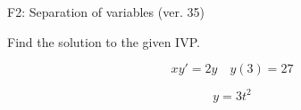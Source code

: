 \begin{exercise}
  \begin{exerciseTitle}F2: Separation of variables (ver. 35)\end{exerciseTitle}
  \begin{exerciseStatement}
    
Find the solution to the given IVP.

    
\[xy'= 2 y \hspace{1em} y( 3 ) = 27\]

  \end{exerciseStatement}
  \begin{exerciseAnswer}
    
\[y= 3 t^ 2\]

  \end{exerciseAnswer}
\end{exercise}